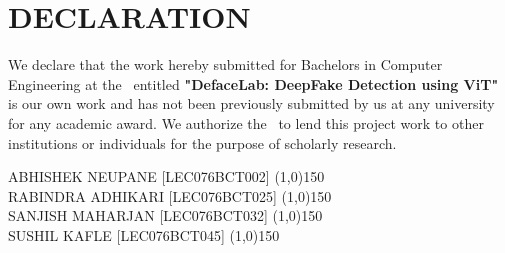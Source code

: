 \section*{DECLARATION}

We declare that the work hereby submitted for Bachelors in Computer Engineering at the \thecampus \ entitled \textbf{"DefaceLab:  DeepFake Detection using ViT"} is our own work and has not been previously submitted by us at any university for any academic award.
We authorize the \thecampus \ to lend this project work
to other institutions or individuals for the purpose of scholarly research.

\vspace{1cm}
\noindent ABHISHEK NEUPANE [LEC076BCT002] \space{}\space{}\space{}\space{}\space{}\space{}  \line(1,0){150}\\
RABINDRA ADHIKARI [LEC076BCT025] \space{}\space{}\space{}\space{} \line(1,0){150} \\
SANJISH MAHARJAN [LEC076BCT032] \space{}\space{}\space{}\space{}\space{}\space{}\space{} \line(1,0){150} \\
SUSHIL KAFLE [LEC076BCT045] \space{}\space{}\space{}\space{}\space{}\space{}\space{}\space{}\space{}\space{}\space{}\space{}\space{}\space{}\space{}\space{}\space{}\space{}\space{}\line(1,0){150}\\


\vspace{0.7cm}
\noindent \thedate \\
